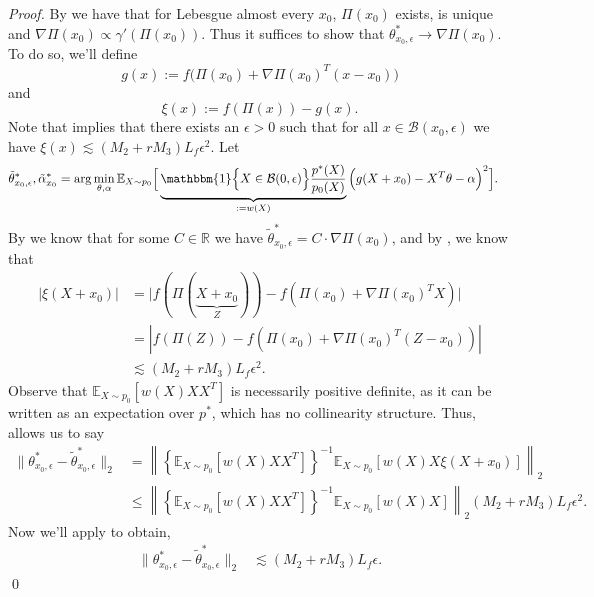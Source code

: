 \documentclass[11pt]{article}
\begin{document}
\noindent \textit{Proof.} By  we have that for Lebesgue almost every $x_0$, $\Pi(x_0)$ exists, is unique and $\nabla\Pi(x_0) \propto \gamma'(\Pi(x_0))$. Thus it suffices to show that $\theta^*_{x_0, \epsilon} \rightarrow \nabla\Pi(x_0)$. To do so, we'll define 
\[g(x) := f\Big(\Pi(x_0) + \nabla\Pi(x_0)^{T}(x-x_0)\Big)\]
and 
\[\xi(x) := f(\Pi(x)) - g(x).\] Note that  implies that there exists an $\epsilon > 0$ such that for all $x \in \mathcal{B}(x_0, \epsilon)$ we have $\xi(x) \lesssim (M_2 + rM_3)L_f\epsilon^2$. Let  
\begin{align}
    \tilde{\theta}^*_{x_0, \epsilon}, \tilde{\alpha}_{x_0}^* &= \arg\min_{\theta, \alpha}\mathbb{E}_{X\sim p_0}\Big[\underbrace{\mathbbm{1}\Big\{X \in \mathcal{B}(0, \epsilon)\Big\}\frac{p^*(X)}{p_{0}(X)}}_{:=w(X)}\Big(g(X+x_0) - X^{T}\theta - \alpha\Big)^2\Big]. \label{eq: perturbed pop estimator}
\end{align}
By  we know that for some $C \in \mathbb{R}$ we have $\tilde{\theta}^*_{x_0, \epsilon}  = C\cdot \nabla\Pi(x_0)$, and by , we know that
\begin{align*}
    \left|\xi(X+x_0)\right| &= \big|f(\Pi(\underbrace{X+x_0}_{Z})) - f\left(\Pi(x_0) + \nabla\Pi(x_0)^TX\right)\big| \\
    &= \left|f(\Pi(Z)) - f\left(\Pi(x_0) + \nabla\Pi(x_0)^T(Z-x_0)\right)\right|\\
    &\lesssim (M_2 + rM_3)L_f\epsilon^2.
\end{align*}
Observe that $\mathbb{E}_{X\sim p_{0}}[w(X)XX^{T}]$ is necessarily positive definite, as it can be written as an expectation over $p^*$, which has no collinearity structure. Thus,  allows us to say 
\begin{align*} 
\|\theta^*_{x_0, \epsilon} - \tilde{\theta}_{x_0, \epsilon}^*\|_2 &= \left\|\left\{\mathbb{E}_{X\sim p_{0}}[w(X)XX^{T}]\right\}^{-1}\mathbb{E}_{X\sim p_{0}}[w(X)X\xi(X+x_0)]\right\|_2 \\
&\leq \left\|\left\{\mathbb{E}_{X\sim p_{0}}[w(X)XX^{T}]\right\}^{-1}\mathbb{E}_{X\sim p_{0}}[w(X)X]\right\|_2(M_2 + rM_3)L_f\epsilon^2.
\end{align*}
Now we'll apply  to obtain,
\begin{align}
    \|\theta^*_{x_0, \epsilon} - \tilde{\theta}_{x_0, \epsilon}^*\|_2 &\lesssim (M_2 + rM_3)L_f\epsilon.
\end{align}
\qed{}
\end{document}
